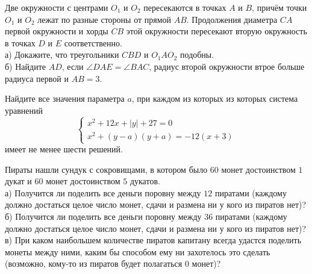 \begin{training}
\begin{listofex}[resume]
		\item Две окружности с центрами \( O_1 \) и \( O_2 \) пересекаются в точках \( A \) и \( B \), причём точки \( O_1 \) и \( O_2 \) лежат по разные стороны от прямой \( AB \). Продолжения диаметра \( CA \) первой окружности и хорды \( CB \) этой окружности пересекают вторую окружность в точках \( D \) и \( E \) соответственно. \\
		а) Докажите, что треугольники \( CBD \) и \( O_1AO_2 \) подобны.\\
		б) Найдите \( AD \), если \( \angle DAE=\angle BAC \), радиус второй окружности втрое больше радиуса первой и \( AB=3 \).
		\item Найдите все значения параметра \( a \), при каждом из которых из которых система уравнений
		\[\begin{cases} x^2+12x+|y|+27=0 \\ x^2+(y-a)(y+a)=-12(x+3) \end{cases}\]
		имеет не менее шести решений.
		\item Пираты нашли сундук с сокровищами, в котором было \( 60 \) монет достоинством \( 1 \) дукат и \( 60  \) монет достоинством \( 5 \) дукатов.\\
		а) Получится ли поделить все деньги поровну между \( 12 \) пиратами (каждому должно достаться целое число монет, сдачи и размена ни у кого из пиратов нет)?\\
		б) Получится ли поделить все деньги поровну между \( 36 \) пиратами (каждому должно достаться целое число монет, сдачи и размена ни у кого из пиратов нет)?\\
		в) При каком наибольшем количестве пиратов капитану всегда удастся поделить монеты между ними, каким бы способом ему ни захотелось это сделать (возможно, кому-то из пиратов будет полагаться 0 монет)?
	\end{listofex}
\end{training}

